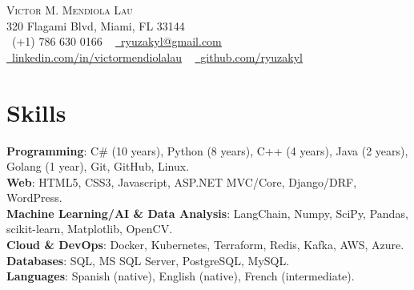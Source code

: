 \documentclass[letterpaper,11pt]{article}
\begin{document}

\begin{center}
    {\Huge \scshape Victor M. Mendiola Lau} \\ \vspace{1pt}
    320 Flagami Blvd, Miami, FL 33144 \\ \vspace{1pt}
    \small \raisebox{-0.1\height}\faPhone\ (+1) 786 630 0166 ~ \href{mailto:ryuzakyl@gmail.com}{\raisebox{-0.2\height}\faEnvelope\  \underline{ryuzakyl@gmail.com}} ~ 
    \href{https://www.linkedin.com/in/victormendiolalau}{\raisebox{-0.2\height}\faLinkedin\ \underline{linkedin.com/in/victormendiolalau}}  ~
    \href{https://github.com/ryuzakyl}{\raisebox{-0.2\height}\faGithub\ \underline{github.com/ryuzakyl}}
    \vspace{-8pt}
\end{center}

%

\section{Skills}
 \begin{itemize}[leftmargin=0.15in, label={}]
    \small{\item{
      \textbf{Programming}{: C\# (10 years), Python (8 years), C++ (4 years), Java (2 years), Golang (1 year), Git, GitHub, Linux.} \\
      \textbf{Web}{: HTML5, CSS3, Javascript, ASP.NET MVC/Core, Django/DRF, WordPress.} \\
      \textbf{Machine Learning/AI \& Data Analysis}{: LangChain, Numpy, SciPy, Pandas, scikit-learn, Matplotlib, OpenCV.} \\
      \textbf{Cloud \& DevOps}{: Docker, Kubernetes, Terraform, Redis, Kafka, AWS, Azure.} \\
      \textbf{Databases}{: SQL, MS SQL Server, PostgreSQL, MySQL.} \\
      \textbf{Languages}{: Spanish (native), English (native), French (intermediate).} \\
    }}
 \end{itemize}
 \vspace{-16pt}
\end{document}
